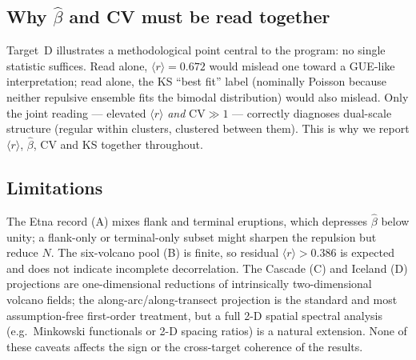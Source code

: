 \documentclass[11pt]{article}
\begin{document}
\subsection{Why $\hat\beta$ and CV must be read together}
Target~D illustrates a methodological point central to the program: no single
statistic suffices. Read alone, $\langle r\rangle=0.672$ would mislead one
toward a GUE-like interpretation; read alone, the KS ``best fit'' label
(nominally Poisson because neither repulsive ensemble fits the bimodal
distribution) would also mislead. Only the joint reading --- elevated
$\langle r\rangle$ \emph{and} $\mathrm{CV}\gg1$ --- correctly diagnoses
dual-scale structure (regular within clusters, clustered between them). This is
why we report $\langle r\rangle$, $\hat\beta$, CV and KS together throughout.

\subsection{Limitations}
The Etna record (A) mixes flank and terminal eruptions, which depresses
$\hat\beta$ below unity; a flank-only or terminal-only subset might sharpen the
repulsion but reduce $N$. The six-volcano pool (B) is finite, so residual
$\langle r\rangle>0.386$ is expected and does not indicate incomplete
decorrelation. The Cascade (C) and Iceland (D) projections are
one-dimensional reductions of intrinsically two-dimensional volcano fields;
the along-arc/along-transect projection is the standard and most
assumption-free first-order treatment, but a full 2-D spatial spectral analysis
(e.g.\ Minkowski functionals or 2-D spacing ratios) is a natural extension. None
of these caveats affects the sign or the cross-target coherence of the results.
\end{document}
